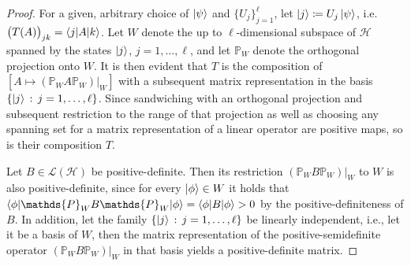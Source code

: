 \documentclass[10pt,conference]{IEEEtran}
\newcommand*{\hil}{\mathcal{H}}       %
\newcommand*{\defcolon}{\,:\,}        %
\newcommand*{\projection}{\mathds{P}} %
\newcommand*{\lo}{\mathcal{L}}        %
\begin{document}
\begin{proof}
    For a given, arbitrary choice of $\ket{\psi}$ and $\{U_{j}\}_{j = 1}^{\ell}$, let $\ket{j} \coloneqq U_{j} \ket{\psi}$, i.e.\ $\big(T(A)\big)_{j k} = \braket{j | A | k}$.
    Let $W$ denote the up to $\ell$-dimensional subspace of $\hil$ spanned by the states $\ket{j}$, $j = 1, \ldots, \ell$, and let $\projection_{W}$ denote the orthogonal projection onto $W$.
    It is then evident that $T$ is the composition of $[A \mapsto (\projection_{W} A \projection_{W})\vert_{W}]$ with a subsequent matrix representation in the basis $\{\ket{j} \defcolon j = 1, \ldots, \ell\}$.
    Since sandwiching with an orthogonal projection and subsequent restriction to the range of that projection as well as choosing any spanning set for a matrix representation of a linear operator are positive maps, so is their composition $T$.

    Let $B \in \lo(\hil)$ be positive-definite.
    Then its restriction $(\projection_{W} B \projection_{W})\vert_{W}$ to $W$ is also positive-definite, since for every $\ket{\phi} \in W$ it holds that
    $\braket{\phi | \projection_{W} B \projection_{W} | \phi} = \braket{\phi | B | \phi} > 0$ by the positive-definiteness of $B$.
    In addition, let the family $\{\ket{j} \defcolon j = 1, \ldots, \ell\}$ be linearly independent, i.e., let it be a basis of $W$, then the matrix representation of the positive-semidefinite operator $(\projection_{W} B \projection_{W})\vert_{W}$ in that basis yields a positive-definite matrix.
\end{proof}
\end{document}
